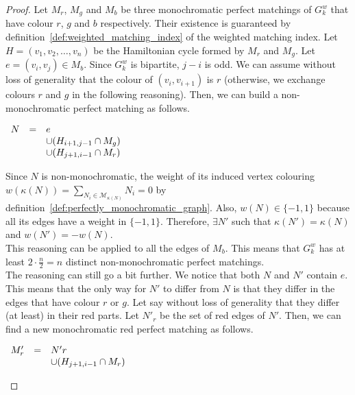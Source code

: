 \begin{proof}
    Let $M_r$, $M_g$ and $M_b$ be three monochromatic perfect matchings of $G_k^w$ that have colour $r$, $g$ and $b$ respectively.
    Their existence is guaranteed by definition~\ref{def:weighted_matching_index} of the weighted matching index.
    Let $H = (v_1, v_2, \dots, v_n)$ be the Hamiltonian cycle formed by $M_r$ and $M_g$.
    Let $e = (v_i, v_j) \in M_b$.
    Since $G_k^w$ is bipartite, $j-i$ is odd.
    We can assume without loss of generality that the colour of $(v_i, v_{i+1})$ is $r$ (otherwise, we exchange colours $r$ and $g$ in the following reasoning).
    Then, we can build a non-monochromatic perfect matching as follows.

    \begin{center}
        $\begin{array}{r c l}
            N & = & e                             \\
              &   & \cup (H_{i+1, j-1} \cap M_g)  \\
              &   & \cup (H_{j+1, i-1} \cap M_r)
        \end{array}$
    \end{center}

    Since $N$ is non-monochromatic, the weight of its induced vertex colouring $w(\kappa(N)) = \sum\limits_{N_i \in \mathcal{M}_{\kappa(N)}} N_i = 0$ by definition~\ref{def:perfectly_monochromatic_graph}.
    Also, $w(N) \in \{-1, 1\}$ because all its edges have a weight in $\{-1, 1\}$.
    Therefore, $\exists N'$ such that $\kappa(N') = \kappa(N)$ and $w(N') = -w(N)$.\\

    This reasoning can be applied to all the edges of $M_b$.
    This means that $G_k^w$ has at least $2 \cdot \frac{n}{2} = n$ distinct non-monochromatic perfect matchings.\\

    The reasoning can still go a bit further.
    We notice that both $N$ and $N'$ contain $e$.
    This means that the only way for $N'$ to differ from $N$ is that they differ in the edges that have colour $r$ or $g$.
    Let say without loss of generality that they differ (at least) in their red parts.
    Let $N'_r$ be the set of red edges of $N'$.
    Then, we can find a new monochromatic red perfect matching as follows.

    \begin{center}
        $\begin{array}{r c l}
            M'_r & = & N'r \\
                 &   & \cup (H_{j+1, i-1} \cap M_r)
        \end{array}$
    \end{center}


\end{proof}
